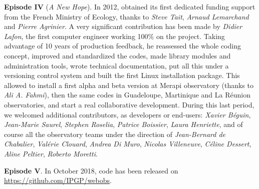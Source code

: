 \textbf{Episode IV} (\textit{A New Hope}). In 2012, \webobs obtained its first dedicated funding support from the French Ministry of Ecology, thanks to \textit{Steve Tait}, \textit{Arnaud Lemarchand} and \textit{Pierre Agrinier}. A very significant contribution has been made by \textit{Didier Lafon}, the first computer engineer working 100\% on the project. Taking advantage of 10 years of production feedback, he reassessed the whole coding concept, improved and standardized the codes, made library modules and administration tools, wrote technical documentation, put all this under a versioning control system and built the first Linux installation package. This allowed to install a first alpha and beta version at Merapi observatory (thanks to \textit{Ali A. Fahmi}), then the same codes in Guadeloupe, Martinique and La Réunion observatories, and start a real collaborative development. During this last period, we welcomed additional contributors, as developers or end-users: \textit{Xavier Béguin}, \textit{Jean-Marie Saurel}, \textit{Stephen Roselia}, \textit{Patrice Boissier}, \textit{Laura Henriette}, and of course all the observatory teams under the direction of \textit{Jean-Bernard de Chabalier}, \textit{Valérie Clouard}, \textit{Andrea Di Muro}, \textit{Nicolas Villeneuve}, \textit{Céline Dessert}, \textit{Aline Peltier}, \textit{Roberto Moretti}.

\textbf{Episode V}. In October 2018, \webobs code has been released on \url{https://github.com/IPGP/webobs}.
